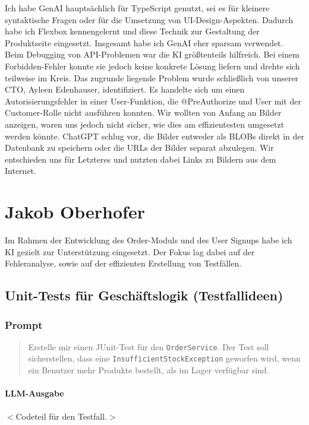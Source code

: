 \documentclass[12pt, a4paper]{scrreprt}
\begin{document}
	Ich habe GenAI hauptsächlich für TypeScript genutzt, sei es für kleinere syntaktische Fragen oder für die Umsetzung von UI-Design-Aspekten. Dadurch habe ich Flexbox kennengelernt und diese Technik zur Gestaltung der Produktseite eingesetzt.
	Insgesamt habe ich GenAI eher sparsam verwendet. Beim Debugging von API-Problemen war die KI größtenteils hilfreich. Bei einem Forbidden-Fehler konnte sie jedoch keine konkrete Lösung liefern und drehte sich teilweise im Kreis.
	Das zugrunde liegende Problem wurde schließlich von unserer CTO, Ayleen Edenhauser, identifiziert. Es handelte sich um einen Autorisierungsfehler in einer User-Funktion, die @PreAuthorize und User mit der Customer-Rolle nicht ausführen konnten.
	Wir wollten von Anfang an Bilder anzeigen, waren uns jedoch nicht sicher, wie dies am effizientesten umgesetzt werden könnte. ChatGPT schlug vor, die Bilder entweder als BLOBs direkt in der Datenbank zu speichern oder die URLs der Bilder separat abzulegen.
	Wir entschieden uns für Letzteres und nutzten dabei Links zu Bildern aus dem Internet.

	\chapter{Jakob Oberhofer}

	Im Rahmen der Entwicklung des Order-Moduls und des User Signups habe ich KI gezielt zur Unterstützung eingesetzt. Der Fokus lag dabei auf der Fehleranalyse, sowie auf der effizienten Erstellung von Testfällen.

	\section{Unit-Tests für Geschäftslogik (Testfallideen)}

	\subsection{Prompt}

	\begin{quote}
		Erstelle mir einen JUnit-Test für den \texttt{OrderService}. Der Test soll sicherstellen, dass eine \texttt{InsufficientStockException} geworfen wird, wenn ein Benutzer mehr Produkte bestellt, als im Lager verfügbar sind.
	\end{quote}

	\subsubsection{LLM-Ausgabe}
	$<$Codeteil für den Testfall.$>$
\end{document}
